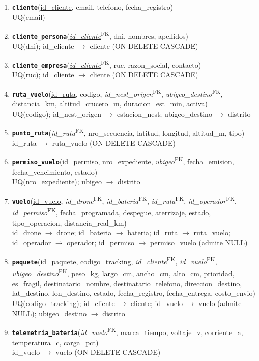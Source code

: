 \documentclass[11pt,a4paper]{article}
\newcommand{\pk}[1]{\underline{#1}}
\newcommand{\fk}[1]{\textit{#1}\textsuperscript{\tiny FK}}
\newcommand{\pkfk}[1]{\underline{\textit{#1}}\textsuperscript{\tiny FK}}
\newcommand{\tb}[1]{\textbf{\texttt{#1}}}
\begin{document}
\begin{enumerate}[leftmargin=*, label=\arabic*.]
\item \tb{cliente}(\pk{id\_cliente}, email, telefono, fecha\_registro)\\
UQ(email)

\item \tb{cliente\_persona}(\pkfk{id\_cliente}, dni, nombres, apellidos)\\
UQ(dni); id\_cliente $\rightarrow$ cliente (ON DELETE CASCADE)

\item \tb{cliente\_empresa}(\pkfk{id\_cliente}, ruc, razon\_social, contacto)\\
UQ(ruc); id\_cliente $\rightarrow$ cliente (ON DELETE CASCADE)

\item \tb{ruta\_vuelo}(\pk{id\_ruta}, codigo, \fk{id\_nest\_origen}, \fk{ubigeo\_destino}, distancia\_km, altitud\_crucero\_m, duracion\_est\_min, activa)\\
UQ(codigo); id\_nest\_origen $\rightarrow$ estacion\_nest; ubigeo\_destino $\rightarrow$ distrito

\item \tb{punto\_ruta}(\pkfk{id\_ruta}, \pk{nro\_secuencia}, latitud, longitud, altitud\_m, tipo)\\
id\_ruta $\rightarrow$ ruta\_vuelo (ON DELETE CASCADE)

\item \tb{permiso\_vuelo}(\pk{id\_permiso}, nro\_expediente, \fk{ubigeo}, fecha\_emision, fecha\_vencimiento, estado)\\
UQ(nro\_expediente); ubigeo $\rightarrow$ distrito

\item \tb{vuelo}(\pk{id\_vuelo}, \fk{id\_drone}, \fk{id\_bateria}, \fk{id\_ruta}, \fk{id\_operador}, \fk{id\_permiso}, fecha\_programada, despegue, aterrizaje, estado, tipo\_operacion, distancia\_real\_km)\\
id\_drone $\rightarrow$ drone; id\_bateria $\rightarrow$ bateria; id\_ruta $\rightarrow$ ruta\_vuelo; id\_operador $\rightarrow$ operador; id\_permiso $\rightarrow$ permiso\_vuelo (admite NULL)

\item \tb{paquete}(\pk{id\_paquete}, codigo\_tracking, \fk{id\_cliente}, \fk{id\_vuelo}, \fk{ubigeo\_destino}, peso\_kg, largo\_cm, ancho\_cm, alto\_cm, prioridad, es\_fragil, destinatario\_nombre, destinatario\_telefono, direccion\_destino, lat\_destino, lon\_destino, estado, fecha\_registro, fecha\_entrega, costo\_envio)\\
UQ(codigo\_tracking); id\_cliente $\rightarrow$ cliente; id\_vuelo $\rightarrow$ vuelo (admite NULL); ubigeo\_destino $\rightarrow$ distrito

\item \tb{telemetria\_bateria}(\pkfk{id\_vuelo}, \pk{marca\_tiempo}, voltaje\_v, corriente\_a, temperatura\_c, carga\_pct)\\
id\_vuelo $\rightarrow$ vuelo (ON DELETE CASCADE)
\end{enumerate}
\end{document}
